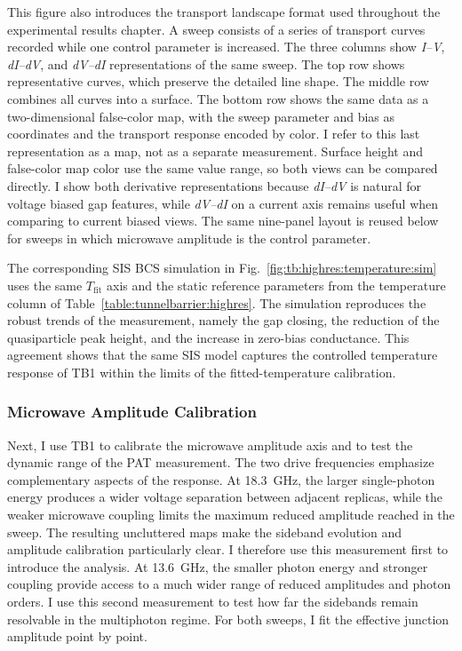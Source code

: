         This figure also introduces the transport landscape format used throughout the experimental results chapter. A sweep consists of a series of transport curves recorded while one control parameter is increased. The three columns show \textit{I--V}, \textit{dI--dV}, and \textit{dV--dI} representations of the same sweep. The top row shows representative curves, which preserve the detailed line shape. The middle row combines all curves into a surface. The bottom row shows the same data as a two-dimensional false-color map, with the sweep parameter and bias as coordinates and the transport response encoded by color. I refer to this last representation as a map, not as a separate measurement. Surface height and false-color map color use the same value range, so both views can be compared directly. I show both derivative representations because \textit{dI--dV} is natural for voltage biased gap features, while \textit{dV--dI} on a current axis remains useful when comparing to current biased views. The same nine-panel layout is reused below for sweeps in which microwave amplitude is the control parameter.

        The corresponding SIS BCS simulation in Fig.~\ref{fig:tb:highres:temperature:sim} uses the same $T_\mathrm{fit}$ axis and the static reference parameters from the temperature column of Table~\ref{table:tunnelbarrier:highres}. The simulation reproduces the robust trends of the measurement, namely the gap closing, the reduction of the quasiparticle peak height, and the increase in zero-bias conductance. This agreement shows that the same SIS model captures the controlled temperature response of TB1 within the limits of the fitted-temperature calibration.

    \subsubsection*{Microwave Amplitude Calibration}
    \label{subsec:tb:highres:amplitude-calibration}

        Next, I use TB1 to calibrate the microwave amplitude axis and to test the dynamic range of the PAT measurement. The two drive frequencies emphasize complementary aspects of the response. At \qty{18.3}{\giga\hertz}, the larger single-photon energy produces a wider voltage separation between adjacent replicas, while the weaker microwave coupling limits the maximum reduced amplitude reached in the sweep. The resulting uncluttered maps make the sideband evolution and amplitude calibration particularly clear. I therefore use this measurement first to introduce the analysis. At \qty{13.6}{\giga\hertz}, the smaller photon energy and stronger coupling provide access to a much wider range of reduced amplitudes and photon orders. I use this second measurement to test how far the sidebands remain resolvable in the multiphoton regime. For both sweeps, I fit the effective junction amplitude point by point.

